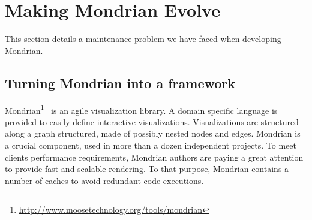 \documentclass[preprint,10pt]{sigplanconf}
\newcommand{\ab}[1]{\nb{Alexandre}{blue}{#1}}
\newcommand{\seclabel}[1]{\label{sec:#1}}
\begin{document}
%
%
%
%

\section{Making Mondrian Evolve}\seclabel{problem}

This section details a maintenance problem we have faced when developing Mondrian.

\subsection{Turning Mondrian into a framework}

Mondrian\footnote{\url{http://www.moosetechnology.org/tools/mondrian}}~\cite{Meye06a} is an agile visualization library. A domain specific language is provided to easily define interactive visualizations.
Visualizations are structured along a graph structured, made of possibly nested nodes and edges. Mondrian is a crucial component, used in more than a dozen independent projects. To meet clients performance requirements, Mondrian authors are paying a great attention to provide fast and scalable rendering. To that purpose, Mondrian contains a number of caches to avoid redundant code executions.
\end{document}
